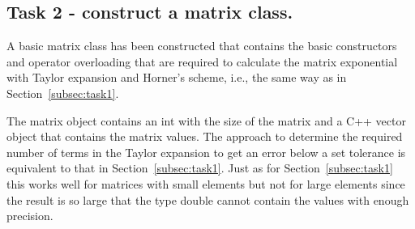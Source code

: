 \documentclass[paper=a4, fontsize=11pt]{article} %
\begin{document}
\subsection{Task 2 - construct a matrix class.}

A basic matrix class has been constructed that contains the basic
constructors and operator overloading that are required to calculate
the matrix exponential with Taylor expansion and Horner's scheme,
i.e., the same way as in Section~\ref{subsec:task1}.

The matrix object contains an int with the size of the matrix and a
C++ vector object that contains the matrix values. The approach to
determine the required number of terms in the Taylor expansion to get
an error below a set tolerance is equivalent to that in
Section~\ref{subsec:task1}. Just as for Section~\ref{subsec:task1}
this works well for matrices with small elements but not for large
elements since the result is so large that the type double cannot
contain the values with enough precision.
\end{document}

